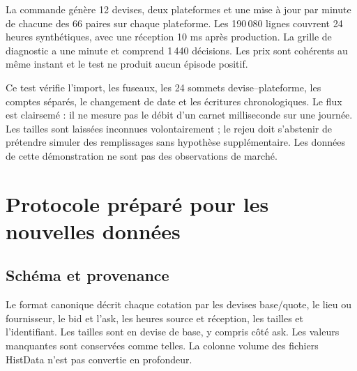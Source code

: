 La commande  génère 12 devises, deux plateformes et une mise à jour par minute de chacune des 66 paires sur chaque plateforme. Les 190\,080 lignes couvrent 24 heures synthétiques, avec une réception 10 ms après production. La grille de diagnostic a une minute et comprend 1\,440 décisions. Les prix sont cohérents au même instant et le test ne produit aucun épisode positif.

Ce test vérifie l'import, les fuseaux, les 24 sommets devise--plateforme, les comptes séparés, le changement de date et les écritures chronologiques. Le flux est clairsemé : il ne mesure pas le débit d'un carnet milliseconde sur une journée. Les tailles sont laissées inconnues volontairement ; le rejeu doit s'abstenir de prétendre simuler des remplissages sans hypothèse supplémentaire. Les données de cette démonstration ne sont pas des observations de marché.

\section{Protocole préparé pour les nouvelles données}
\label{sec:ext-future-data}

\subsection{Schéma et provenance}

Le format canonique décrit chaque cotation par les devises base/quote, le lieu ou fournisseur, le bid et l'ask, les heures source et réception, les tailles et l'identifiant. Les tailles sont en devise de base, y compris côté ask. Les valeurs manquantes sont conservées comme telles. La colonne volume des fichiers HistData n'est pas convertie en profondeur.

